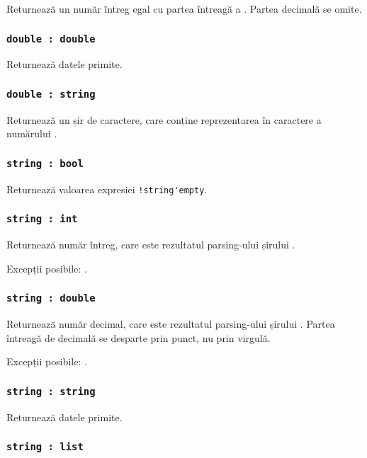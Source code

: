 Returnează un număr întreg egal cu partea întreagă a \double. Partea decimală se omite.

\subsubsection{\lstinline|double : double|}

Returnează datele primite.

\subsubsection{\lstinline|double : string|}

Returnează un șir de caractere, care conține reprezentarea în caractere a numărului \double.

\subsubsection{\lstinline|string : bool|}

Returnează valoarea expresiei \lstinline|!string'empty|.

\subsubsection{\lstinline|string : int|}

Returnează număr întreg, care este rezultatul parsing-ului șirului \str.

Excepții posibile: .

\subsubsection{\lstinline|string : double|}

Returnează număr decimal, care este rezultatul parsing-ului șirului \str. Partea întreagă de decimală se desparte prin punct, nu prin virgulă.

Excepții posibile: .

\subsubsection{\lstinline|string : string|}

Returnează datele primite.

\subsubsection{\lstinline|string : list|}

